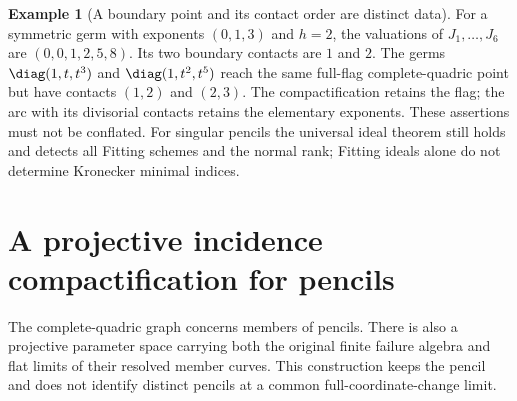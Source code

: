 \documentclass[11pt,reqno]{amsart}
\numberwithin{equation}{section}
\theoremstyle{definition}\newtheorem{definition}[theorem]{Definition}
\newtheorem{example}[theorem]{Example}
\theoremstyle{remark}\newtheorem{remark}[theorem]{Remark}
\begin{document}
\begin{example}[A boundary point and its contact order are distinct data]
\label{ex:contact-profile-v157}
For a symmetric germ with exponents $(0,1,3)$ and $h=2$, the valuations
of $J_1,\ldots,J_6$ are $(0,0,1,2,5,8)$.
Its two boundary contacts are $1$ and $2$. The germs
$\diag(1,t,t^3)$ and $\diag(1,t^2,t^5)$ reach the same full-flag
complete-quadric point but have contacts $(1,2)$ and $(2,3)$.
The compactification retains the flag; the arc with its divisorial
contacts retains the elementary exponents. These assertions must not
be conflated. For singular pencils the universal ideal theorem still
holds and detects all Fitting schemes and the normal rank; Fitting
ideals alone do not determine Kronecker minimal indices.
\end{example}


\section{A projective incidence compactification for pencils}
\label{sec:pencil-compactification-v157}
The complete-quadric graph concerns members of pencils. There is also
a projective parameter space carrying both the original finite failure
algebra and flat limits of their resolved member curves. This construction
keeps the pencil and does not identify distinct pencils at a common
full-coordinate-change limit.
\end{document}
